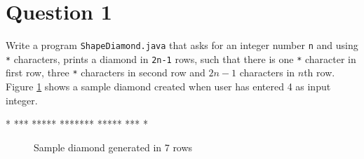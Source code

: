 %
%
%
%

\section*{Question 1}
Write a program \texttt{ShapeDiamond.java} that asks for an integer number \texttt{n} and using \texttt{*} characters, prints a diamond in \texttt{2n-1} rows, such that there is one \texttt{*} character in first row, three \texttt{*} characters in second row and $2n-1$ characters in $n$th row.
Figure \ref{fig1} shows a sample diamond created when user has entered 4 as input integer.
\begin{verbbox}
   *
  ***
 *****
*******
 *****
  ***
   *
\end{verbbox}
\begin{figure}[H]\centering
\theverbbox
\caption{Sample diamond generated in 7 rows} \label{fig1}
\end{figure}

